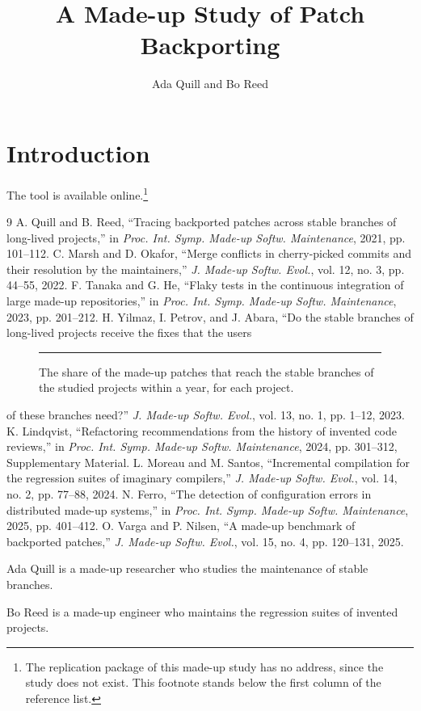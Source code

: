 \documentclass[journal]{IEEEtran}
\begin{document}
\title{A Made-up Study of Patch Backporting}
\author{Ada Quill and Bo Reed}
\maketitle
\begin{abstract}
\lipsum[1][1-4]
\end{abstract}
\section{Introduction}
\lipsum[2][1-5]
The tool is available online.\footnote{The replication package of this made-up study has no address, since the
study does not exist. This footnote stands below the first column of the reference list.}
\lipsum[3][1-2]

\begin{thebibliography}{9}
 A. Quill and B. Reed, ``Tracing backported patches across stable branches of long-lived projects,'' in
\emph{Proc. Int. Symp. Made-up Softw. Maintenance}, 2021, pp. 101--112.
 C. Marsh and D. Okafor, ``Merge conflicts in cherry-picked commits and their resolution by the
maintainers,'' \emph{J. Made-up Softw. Evol.}, vol. 12, no. 3, pp. 44--55, 2022.
 F. Tanaka and G. He, ``Flaky tests in the continuous integration of large made-up repositories,'' in
\emph{Proc. Int. Symp. Made-up Softw. Maintenance}, 2023, pp. 201--212.
 H. Yilmaz, I. Petrov, and J. Abara, ``Do the stable branches of long-lived projects receive the\pagebreak{}
fixes that the users
\begin{figure}[!t]
\centering\rule{0.8\linewidth}{2cm}
\caption{The share of the made-up patches that reach the stable branches of the studied projects within a year, for
each project.}
\end{figure}
of these branches need?'' \emph{J. Made-up Softw. Evol.}, vol. 13, no. 1, pp. 1--12, 2023.
 K. Lindqvist, ``Refactoring recommendations from the history of invented code reviews,'' in
\emph{Proc. Int. Symp. Made-up Softw. Maintenance}, 2024, pp. 301--312,\linebreak{} Supplementary Material.
 L. Moreau and M. Santos, ``Incremental compilation for the regression suites of imaginary compilers,''
\emph{J. Made-up Softw. Evol.}, vol. 14, no. 2, pp. 77--88, 2024.
 N. Ferro, ``The detection of configuration errors in distributed made-up systems,'' in
\emph{Proc. Int. Symp. Made-up Softw. Maintenance}, 2025, pp. 401--412.
 O. Varga and P. Nilsen, ``A made-up benchmark of backported patches,'' \emph{J. Made-up Softw. Evol.},
vol. 15, no. 4, pp. 120--131, 2025.
\end{thebibliography}
\begin{IEEEbiographynophoto}{Ada Quill}
is a made-up researcher who studies the maintenance of stable branches. \lipsum[4][1-6]
\end{IEEEbiographynophoto}
\begin{IEEEbiographynophoto}{Bo Reed}
is a made-up engineer who maintains the regression suites of invented projects. \lipsum[5-9]
\end{IEEEbiographynophoto}
\end{document}
